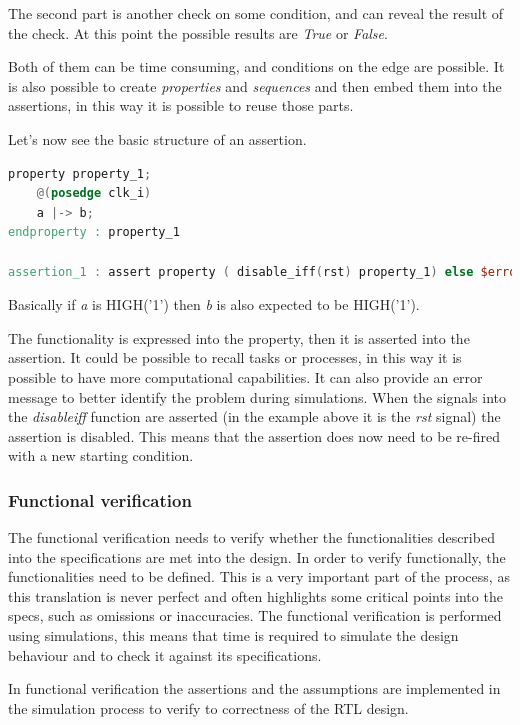 The second part is another check on some condition, and can reveal the result of the check. At this point the possible results are \textit{True} or \textit{False}.

Both of them can be time consuming, and conditions on the edge are possible.
It is also possible to create \textit{properties} and \textit{sequences} and then embed them into the assertions, in this way it is possible to reuse those parts.

Let's now see the basic structure of an assertion.
\bigskip

\linespread{1}
\begin{lstlisting}[language=Verilog,style=verilog-style, backgroundcolor=\color{lyel_palette}, frame=tlb]
property property_1;
    @(posedge clk_i)
	a |-> b;
endproperty : property_1

assertion_1 : assert property ( disable_iff(rst) property_1) else $error("")

\end{lstlisting}
\linespread{1.2}
\bigskip

Basically if \emph{a} is HIGH('1') then \emph{b} is also expected to be HIGH('1').

The functionality is expressed into the property, then it is asserted into the assertion. It could be possible to recall tasks or processes, in this way it is possible to have more computational capabilities.
It can also provide an error message to better identify the problem during simulations.
When the signals into the \emph{disable\+iff} function are asserted (in the example above it is the \emph{rst} signal) the assertion is disabled. This means that the assertion does now need to be re-fired with a new starting condition.


\subsubsection{Functional verification}
The functional verification needs to verify whether the functionalities described into the specifications are met into the design. In order to verify functionally, the functionalities need to be defined. This is a very important part of the process, as this translation is never perfect and often highlights some critical points into the specs, such as omissions or inaccuracies. The functional verification is performed using simulations, this means that time is required to simulate the design behaviour and to check it against its specifications.

In functional verification the assertions and the assumptions are implemented in the simulation process to verify to correctness of the RTL design.

